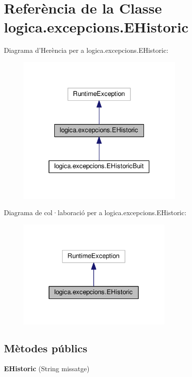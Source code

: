 \hypertarget{classlogica_1_1excepcions_1_1_e_historic}{\section{Referència de la Classe logica.\+excepcions.\+E\+Historic}
\label{classlogica_1_1excepcions_1_1_e_historic}
}


Diagrama d'Herència per a logica.\+excepcions.\+E\+Historic\+:\nopagebreak
\begin{figure}[H]
\begin{center}
\leavevmode
\includegraphics[width=235pt]{classlogica_1_1excepcions_1_1_e_historic__inherit__graph}
\end{center}
\end{figure}


Diagrama de col·laboració per a logica.\+excepcions.\+E\+Historic\+:\nopagebreak
\begin{figure}[H]
\begin{center}
\leavevmode
\includegraphics[width=218pt]{classlogica_1_1excepcions_1_1_e_historic__coll__graph}
\end{center}
\end{figure}
\subsection*{Mètodes públics}
\begin{DoxyCompactItemize}
\item 
\hypertarget{classlogica_1_1excepcions_1_1_e_historic_acab5c3f0a9627e9d9d228e34922dcb2b}{{\bfseries E\+Historic} (String missatge)}\label{classlogica_1_1excepcions_1_1_e_historic_acab5c3f0a9627e9d9d228e34922dcb2b}

\end{DoxyCompactItemize}


